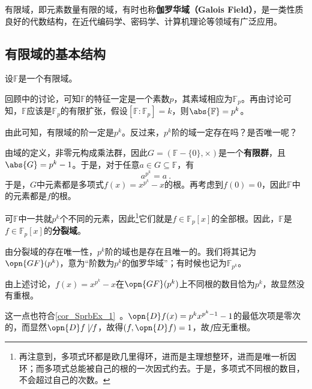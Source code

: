 


有限域，即元素数量有限的域，有时也称\textbf{伽罗华域（Galois Field）}，是一类性质良好的代数结构，在近代编码学、密码学、计算机理论等领域有广泛应用。

\subsection{有限域的基本结构}

设$\mathbb{F}$是一个有限域。

回顾中的讨论，可知$\mathbb{F}$的特征一定是一个素数$p$，其素域相应为$\mathbb{F}_p$。再由讨论可知，$\mathbb{F}$应该是$\mathbb{F}_p$的有限扩张，假设$[\mathbb{F}:\mathbb{F}_p]=k$，则$\abs{\mathbb{F}}=p^k$。

由此可知，有限域的阶一定是$p^k$。反过来，$p^k$阶的域一定存在吗？是否唯一呢？

由域的定义，非零元构成乘法群，因此$G=(\mathbb{F}-\{0\}, \times)$是一个\textbf{有限群}，且$\abs{G}=p^k-1$。于是，对于任意$a\in G\subseteq\mathbb{F}$，有
\begin{equation}
a^{p^k}=a~.
\end{equation}
于是，$G$中元素都是多项式$f(x)=x^{p^k}-x$的根。再考虑到$f(0)=0$，因此$\mathbb{F}$中的元素都是$f$的根。

可$\mathbb{F}$中一共就$p^k$个不同的元素，因此\footnote{再注意到，多项式环都是欧几里得环，进而是主理想整环，进而是唯一析因环；而多项式总能被自己的根的一次因式约去。于是，多项式不同根的数目，不会超过自己的次数。}它们就是$f\in\mathbb{F}_p[x]$的全部根。因此，$\mathbb{F}$是$f\in\mathbb{F}_p[x]$的\textbf{分裂域}。

由分裂域的存在唯一性，$p^k$阶的域也是存在且唯一的。我们将其记为$\opn{GF}(p^k)$，意为“阶数为$p^k$的伽罗华域”；有时候也记为$\mathbb{F}_{p^k}$。

\begin{example}{}
由上述讨论，$f(x)=x^{p^k}-x$在$\opn{GF}(p^k)$上不同根的数目恰为$p^k$，故显然没有重根。

这一点也符合\autoref{cor_SprbEx_1}~。$\opn{D}f(x)=p^kx^{p^k-1}-1$的最低次项是零次的，而显然$\opn{D}f\not\mid f$，故得$(f, \opn{D}f)=1$，故$f$应无重根。
\end{example}


